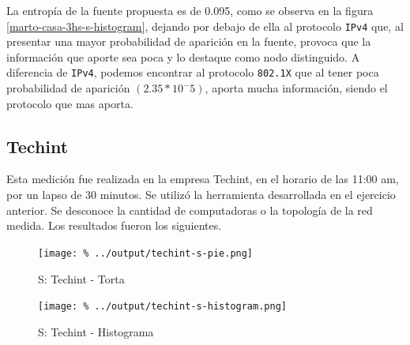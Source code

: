 \documentclass[final,narroweqnarray,inline]{ieee}
\begin{document}
    La entropía de la fuente propuesta es de 0.095, como se observa en la
    figura \ref{marto-casa-3hs-s-histogram}, dejando por debajo de ella al
    protocolo \texttt{IPv4} que, al presentar una mayor probabilidad de
    aparición en la fuente, provoca que la información que aporte sea
    poca y lo destaque como nodo distinguido. A diferencia de
    \texttt{IPv4}, podemos encontrar al protocolo \texttt{802.1X} que al
    tener poca probabilidad de aparición $(2.35 * 10^-5)$, aporta mucha
    información, siendo el protocolo que mas aporta.
      
    
    \subsection{Techint}

    Esta medición fue realizada en la empresa Techint, en el horario de
    las 11:00 am, por un lapso de 30 minutos. Se utilizó la herramienta
    desarrollada en el ejercicio anterior. Se desconoce la cantidad de
    computadoras o la topología de la red medida. Los resultados fueron
    los siguientes.
    
    
    \begin{figure}[H]\begin{center}
      \texttt{[image: \%
      ../output/techint-s-pie.png]}
      \vspace{-3em}
      \caption{S: Techint - Torta}
      \label{techint-s-pie}
    \end{center}\end{figure}
 
     
    \begin{figure}[H]\begin{center}
      \texttt{[image: \%
      ../output/techint-s-histogram.png]}
      \caption{S: Techint - Histograma}
      \label{techint-s-histogram}
    \end{center}\end{figure}
\end{document}
